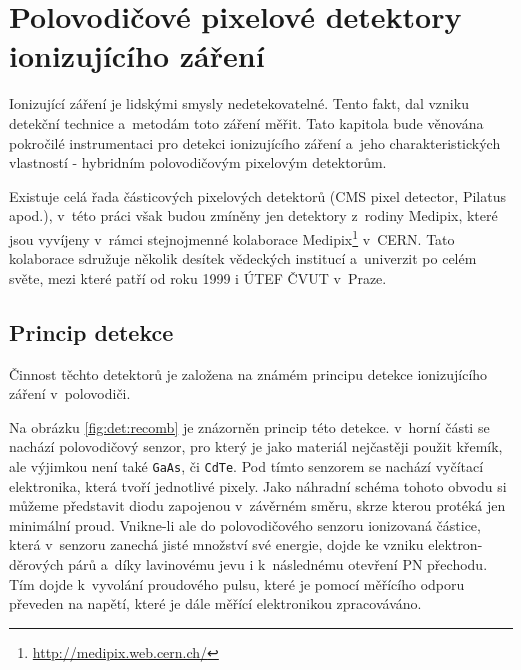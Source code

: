 

\chapter{Polovodičové pixelové detektory ionizujícího záření}\label{det}
Ionizující záření je lidskými smysly nedetekovatelné. Tento fakt, dal vzniku detekční technice a~metodám toto záření měřit. Tato kapitola bude věnována pokročilé instrumentaci pro detekci ionizujícího záření a~jeho charakteristických vlastností - hybridním polovodičovým pixelovým detektorům.

Existuje celá řada částicových pixelových detektorů (CMS pixel detector, Pilatus apod.), v~této práci však budou zmíněny jen detektory z~rodiny Medipix, které jsou vyvíjeny v~rámci stejnojmenné kolaborace Medipix\footnote{\url{http://medipix.web.cern.ch/}} v~CERN. Tato kolaborace sdružuje několik desítek vědeckých institucí a~univerzit po celém světe, mezi které patří od roku 1999 i ÚTEF ČVUT v~Praze.


\clearpage

\section{Princip detekce}
Činnost těchto detektorů je založena na známém principu detekce ionizujícího záření v~polovodiči. 

Na obrázku \ref{fig:det:recomb} je znázorněn princip této detekce. v~horní části se nachází polovodičový senzor, pro který je jako materiál nejčastěji použit křemík, ale výjimkou není také \texttt{GaAs}, či \texttt{CdTe}. Pod tímto senzorem se nachází vyčítací elektronika, která tvoří jednotlivé pixely. Jako náhradní schéma tohoto obvodu si můžeme představit diodu zapojenou v~závěrném směru, skrze kterou protéká jen minimální proud. Vnikne-li ale do polovodičového senzoru ionizovaná částice, která v~senzoru zanechá jisté množství své energie, dojde ke vzniku elektron-děrových párů a~díky lavinovému jevu i k~následnému otevření PN přechodu. Tím dojde k~vyvolání proudového pulsu, které je pomocí měřícího odporu převeden na napětí, které je dále měřící elektronikou zpracováváno.

